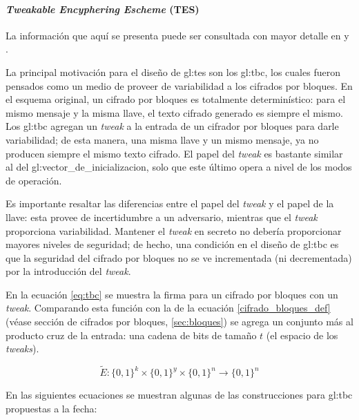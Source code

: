 %
%

\paragraph{\textit{Tweakable Encyphering Escheme} (TES)}

La información que aquí se presenta puede ser consultada con mayor detalle en
\cite{cifradores_de_disco} y \cite{tweaks}.

La principal motivación para el diseño de \gls{gl:tes} son los \gls{gl:tbc},
los cuales fueron pensados como un medio de proveer de variabilidad a
los cifrados por bloques. En el esquema original, un cifrado por bloques es
totalmente determinístico: para el mismo mensaje y la misma llave, el texto
cifrado generado es siempre el mismo. Los \gls{gl:tbc} agregan un
\textit{tweak} a la entrada de un cifrador por bloques para darle
variabilidad; de esta manera, una misma llave y un mismo mensaje, ya no
producen siempre el mismo texto cifrado. El papel del \textit{tweak} es
bastante similar al del \gls{gl:vector_de_inicializacion}, solo que este
último opera a nivel de los modos de operación.

Es importante resaltar las diferencias entre el papel del \textit{tweak} y el
papel de la llave: esta provee de incertidumbre a un adversario,
mientras que el \textit{tweak} proporciona variabilidad. Mantener el
\textit{tweak} en secreto no debería proporcionar mayores niveles de
seguridad; de hecho, una condición en el diseño de \gls{gl:tbc} es que la
seguridad del cifrado por bloques no se ve incrementada (ni decrementada) por
la introducción del \textit{tweak}.

En la ecuación \ref{eq:tbc} se muestra la firma para un cifrado por bloques
con un \textit{tweak}. Comparando esta función con la de la ecuación
\ref{cifrado_bloques_def} (véase sección de cifrados por bloques,
\ref{sec:bloques}) se agrega un conjunto más al producto cruz de la entrada:
una cadena de bits de tamaño $ t $ (el espacio de los \textit{tweaks}).

\begin{equation}
  \label{eq:tbc}
  \tilde{E}: \{0,1\}^k \times \{0,1\}^y \times \{0,1\}^n
  \longrightarrow \{0,1\}^n
\end{equation}

En las siguientes ecuaciones se muestran algunas de las construcciones para
\gls{gl:tbc} propuestas a la fecha:

